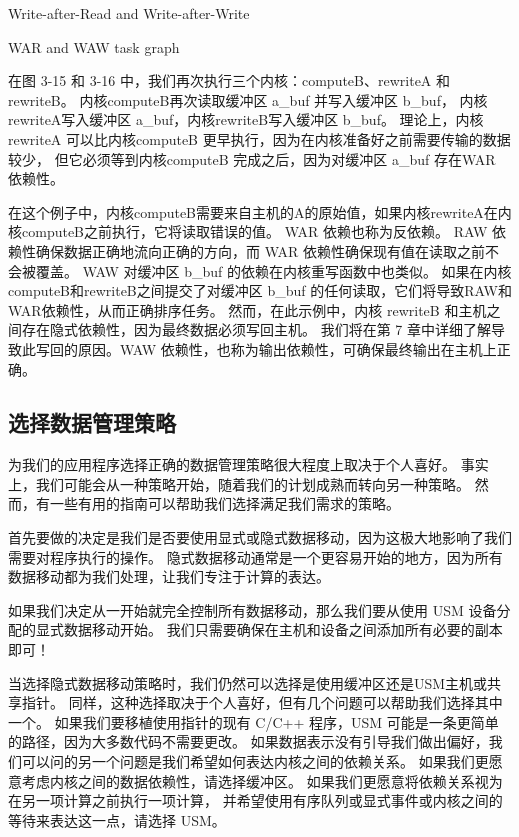 {\color{red} Write-after-Read and Write-after-Write}

{\color{red} WAR and WAW task graph}

在图 3-15 和 3-16 中，我们再次执行三个内核：computeB、rewriteA 和 rewriteB。 
内核computeB再次读取缓冲区 a\_buf 并写入缓冲区 b\_buf，
内核rewriteA写入缓冲区 a\_buf，内核rewriteB写入缓冲区 b\_buf。 
理论上，内核 rewriteA 可以比内核computeB 更早执行，因为在内核准备好之前需要传输的数据较少，
但它必须等到内核computeB 完成之后，因为对缓冲区 a\_buf 存在WAR 依赖性。

在这个例子中，内核computeB需要来自主机的A的原始值，如果内核rewriteA在内核computeB之前执行，它将读取错误的值。 
WAR 依赖也称为反依赖。 RAW 依赖性确保数据正确地流向正确的方向，而 WAR 依赖性确保现有值在读取之前不会被覆盖。 
WAW 对缓冲区 b\_buf 的依赖在内核重写函数中也类似。 
如果在内核computeB和rewriteB之间提交了对缓冲区 b\_buf 的任何读取，它们将导致RAW和WAR依赖性，从而正确排序任务。 
然而，在此示例中，内核 rewriteB 和主机之间存在隐式依赖性，因为最终数据必须写回主机。 
我们将在第 7 章中详细了解导致此写回的原因。WAW 依赖性，也称为输出依赖性，可确保最终输出在主机上正确。

\subsection{选择数据管理策略}
为我们的应用程序选择正确的数据管理策略很大程度上取决于个人喜好。 
事实上，我们可能会从一种策略开始，随着我们的计划成熟而转向另一种策略。 
然而，有一些有用的指南可以帮助我们选择满足我们需求的策略。

首先要做的决定是我们是否要使用显式或隐式数据移动，因为这极大地影响了我们需要对程序执行的操作。 
隐式数据移动通常是一个更容易开始的地方，因为所有数据移动都为我们处理，让我们专注于计算的表达。

如果我们决定从一开始就完全控制所有数据移动，那么我们要从使用 USM 设备分配的显式数据移动开始。 
我们只需要确保在主机和设备之间添加所有必要的副本即可！

当选择隐式数据移动策略时，我们仍然可以选择是使用缓冲区还是USM主机或共享指针。 
同样，这种选择取决于个人喜好，但有几个问题可以帮助我们选择其中一个。 
如果我们要移植使用指针的现有 C/C++ 程序，USM 可能是一条更简单的路径，因为大多数代码不需要更改。 
如果数据表示没有引导我们做出偏好，我们可以问的另一个问题是我们希望如何表达内核之间的依赖关系。 
如果我们更愿意考虑内核之间的数据依赖性，请选择缓冲区。 
如果我们更愿意将依赖关系视为在另一项计算之前执行一项计算，
并希望使用有序队列或显式事件或内核之间的等待来表达这一点，请选择 USM。

